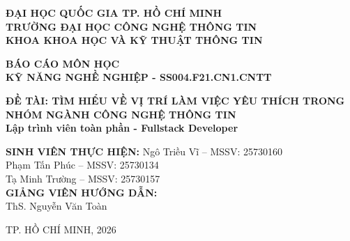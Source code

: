 \documentclass[12pt,a4paper]{article}
\begin{document}
\begin{titlepage}
    \begin{center}
        \textbf{ĐẠI HỌC QUỐC GIA TP. HỒ CHÍ MINH} \\
        \textbf{TRƯỜNG ĐẠI HỌC CÔNG NGHỆ THÔNG TIN} \\
        \textbf{KHOA KHOA HỌC VÀ KỸ THUẬT THÔNG TIN}
        \vspace{1cm}
        \begin{figure}[H]
            \centering
            
        \end{figure}
        
        \vspace{1cm}
        \Large\textbf{BÁO CÁO MÔN HỌC} \\
        \large\textbf{KỸ NĂNG NGHỀ NGHIỆP - SS004.F21.CN1.CNTT}
        
        \vspace{2cm}
        \Large\textbf{ĐỀ TÀI: TÌM HIỂU VỀ VỊ TRÍ LÀM VIỆC YÊU THÍCH TRONG NHÓM NGÀNH CÔNG NGHỆ THÔNG TIN} \\
        \vspace{2cm}
        {\Large \textbf{Lập trình viên toàn phần - Fullstack Developer}}
        
        \vspace{2cm}
        \begin{center}
            \textbf{SINH VIÊN THỰC HIỆN:} Ngô Triều Vĩ – MSSV: 25730160 \\
            \hspace{6cm} Phạm Tấn Phúc – MSSV: 25730134 \\
            \hspace{6cm} Tạ Minh Trường – MSSV: 25730157 \\
            \vspace{0.5cm}
            \textbf{GIẢNG VIÊN HƯỚNG DẪN:} \\ ThS. Nguyễn Văn Toàn
        \end{center}
        
        \vfill
        TP. HỒ CHÍ MINH, 2026
    \end{center}
\end{titlepage}
\end{document}
